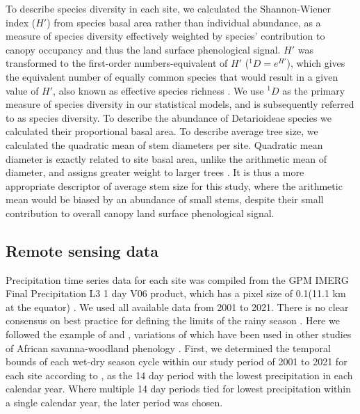 \documentclass[11pt,a4paper]{article}
\begin{document}
To describe species diversity in each site, we calculated the Shannon-Wiener
index ($H'$) from species basal area rather than individual abundance, as a
measure of species diversity effectively weighted by species' contribution to
canopy occupancy and thus the land surface phenological signal. $H'$ was
transformed to the first-order numbers-equivalent of $H'$ ($^1\!D = e^{H'}$),
which gives the equivalent number of equally common species that would result
in a given value of $H'$, also known as effective species richness
\citep{Jost2007}. We use $^1\!D$ as the primary measure of species diversity in
our statistical models, and is subsequently referred to as species diversity.
To describe the abundance of Detarioideae species we calculated their
proportional basal area. To describe average tree size, we calculated the
quadratic mean of stem diameters per site. Quadratic mean diameter is exactly
related to site basal area, unlike the arithmetic mean of diameter, and assigns
greater weight to larger trees \citep{Curtis2000}. It is thus a more
appropriate descriptor of average stem size for this study, where the
arithmetic mean would be biased by an abundance of small stems, despite their
small contribution to overall canopy land surface phenological signal. 

\subsection{Remote sensing data}

Precipitation time series data for each site was compiled from the GPM IMERG
Final Precipitation L3 1 day V06 product, which has a pixel size of
0.1\textdegree (11.1 km at the equator) \citep{IMERG}. We used all available
data from 2001 to 2021. There is no clear consensus on best practice for
defining the limits of the rainy season \citep{Guan2014}. Here we followed the
example of \citet{Stern1981} and \citet{Adole2018b}, variations of which have
been used in other studies of African savanna-woodland phenology
\citep{Mupangwa2011, Segele2005}. First, we determined the temporal bounds of
each wet-dry season cycle within our study period of 2001 to 2021 for each site
according to \citet{Ferijal2022}, as the 14 day period with the lowest
precipitation in each calendar year. Where multiple 14 day periods tied for
lowest precipitation within a single calendar year, the later period was
chosen. 
\end{document}
